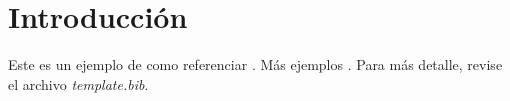 \usepackage[spanish]{babel}
\chapter{Introducci\'on}

Este es un ejemplo de como referenciar \cite{bharat97,agrawal94}.
Más ejemplos \cite{beeferman00}. Para m\'as detalle, revise el archivo \textit{template.bib}. 